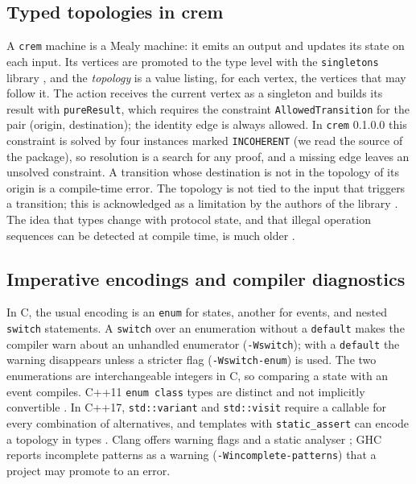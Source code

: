 \documentclass[review,12pt]{elsarticle}
\newcommand{\code}[1]{\texttt{#1}}
\newcommand{\crem}{\texttt{crem}}
\begin{document}
\subsection{Typed topologies in crem}

A \crem{} machine is a Mealy machine: it emits an output and updates its state on each input. Its vertices are promoted to the type level with the \code{singletons} library \cite{eisenberg2012singletons}, and the \emph{topology} is a value listing, for each vertex, the vertices that may follow it. The action receives the current vertex as a singleton and builds its result with \code{pureResult}, which requires the constraint \code{AllowedTransition} for the pair (origin, destination); the identity edge is always allowed. In \code{crem} 0.1.0.0 this constraint is solved by four instances marked \code{INCOHERENT} (we read the source of the package), so resolution is a search for any proof, and a missing edge leaves an unsolved constraint. A transition whose destination is not in the topology of its origin is a compile-time error. The topology is not tied to the input that triggers a transition; this is acknowledged as a limitation by the authors of the library \cite{perone2023crem}. The idea that types change with protocol state, and that illegal operation sequences can be detected at compile time, is much older \cite{strom1986typestate}.

\subsection{Imperative encodings and compiler diagnostics}

In C, the usual encoding is an \code{enum} for states, another for events, and nested \code{switch} statements. A \code{switch} over an enumeration without a \code{default} makes the compiler warn about an unhandled enumerator (\code{-Wswitch}); with a \code{default} the warning disappears unless a stricter flag (\code{-Wswitch-enum}) is used. The two enumerations are interchangeable integers in C, so comparing a state with an event compiles. C++11 \code{enum class} types are distinct and not implicitly convertible \cite{iso14882}. In C++17, \code{std::variant} and \code{std::visit} require a callable for every combination of alternatives, and templates with \code{static\_assert} can encode a topology in types \cite{iso14882}. Clang \cite{clang} offers warning flags and a static analyser \cite{clanganalyzer}; GHC \cite{ghc} reports incomplete patterns as a warning (\code{-Wincomplete-patterns}) that a project may promote to an error.
\end{document}

